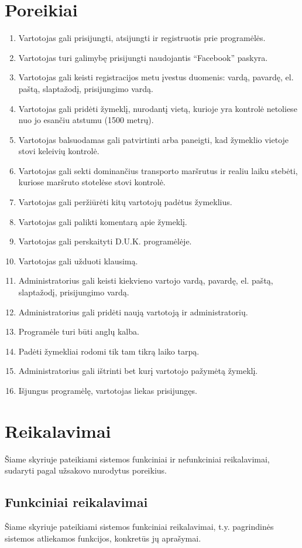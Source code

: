\documentclass{VUMIFPSkursinis}
\begin{document}
\section{Poreikiai}
\begin{enumerate}[itemsep=-2mm]
	\item Vartotojas gali prisijungti, atsijungti ir registruotis prie programėlės.
	\item Vartotojas turi galimybę prisijungti naudojantis “Facebook” paskyra.
	\item Vartotojas gali keisti registracijos metu įvestus duomenis: vardą, pavardę, el. paštą, slaptažodį, prisijungimo vardą.
	\item Vartotojas gali pridėti žymeklį, nurodantį vietą, kurioje yra kontrolė netoliese nuo jo esančiu atstumu (1500 metrų).
	\item Vartotojas balsuodamas gali patvirtinti arba paneigti, kad žymeklio vietoje stovi keleivių kontrolė.
	\item Vartotojas gali sekti dominančius transporto maršrutus ir realiu laiku stebėti, kuriose maršruto stotelėse stovi kontrolė. 
	\item Vartotojas gali peržiūrėti kitų vartotojų padėtus žymeklius. 
	\item Vartotojas gali palikti komentarą apie žymeklį. 
	\item Vartotojas gali perskaityti D.U.K. programėlėje.
	\item Vartotojas gali užduoti klausimą.
	\item Administratorius gali keisti kiekvieno vartojo vardą, pavardę, el. paštą, slaptažodį, prisijungimo vardą.
	\item Administratorius gali pridėti naują vartotoją ir administratorių.
	\item Programėle turi būti anglų kalba. 
	\item Padėti žymekliai rodomi tik tam tikrą laiko tarpą.
	\item Administratorius gali ištrinti bet kurį vartotojo pažymėtą žymeklį.
	\item Išjungus programėlę, vartotojas liekas prisijungęs.
\end{enumerate} 

\section{Reikalavimai}
Šiame skyriuje pateikiami sistemos funkciniai ir nefunkciniai reikalavimai, sudaryti pagal užsakovo nurodytus poreikius.
\subsection{Funkciniai reikalavimai }
Šiame skyriuje pateikiami sistemos funkciniai reikalavimai, t.y. pagrindinės sistemos atliekamos funkcijos, konkretūs jų aprašymai.
\end{document}
